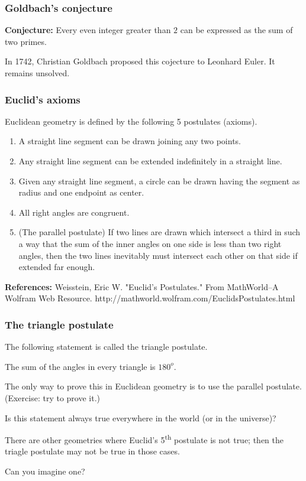 \begin{frame}\frametitle{Goldbach's conjecture}
  \begin{tcolorbox}
    {\bf Conjecture:} Every even integer greater than $2$ can be
    expressed as the sum of two primes.
  \end{tcolorbox}

  In 1742, Christian Goldbach proposed this cojecture to Leonhard
  Euler.  It remains unsolved.
\end{frame}

\begin{frame}\frametitle{Euclid's axioms}
  Euclidean geometry is defined by the following 5 postulates
  (axioms).
  \begin{enumerate}
  \item A straight line segment can be drawn joining any two points.
  \item Any straight line segment can be extended indefinitely in a straight line.
  \item Given any straight line segment, a circle can be drawn having the segment as radius and one endpoint as center.
  \item All right angles are congruent.
  \item (The parallel postulate) If two lines are drawn which
    intersect a third in such a way that the sum of the inner angles
    on one side is less than two right angles, then the two lines
    inevitably must intersect each other on that side if extended far
    enough.
  \end{enumerate}

  {\bf References:} Weisstein, Eric W. "Euclid's Postulates." From
  MathWorld--A Wolfram Web
  Resource. http://mathworld.wolfram.com/EuclidsPostulates.html
\end{frame}

\begin{frame}\frametitle{The triangle postulate}
  The following statement is called the triangle postulate.
  \begin{tcolorbox}
    The sum of the angles in every triangle is $180^{o}$.
  \end{tcolorbox}

  The only way to prove this in Euclidean geometry is to use the
  parallel postulate.  (Exercise: try to prove it.)\pause 

  Is this statement always true everywhere in the world (or in the
  universe)? \pause

  There are other geometries where Euclid's 5\textsuperscript{th}
  postulate is not true; then the triagle postulate may not be true in
  those cases.

  Can you imagine one?
\end{frame}

